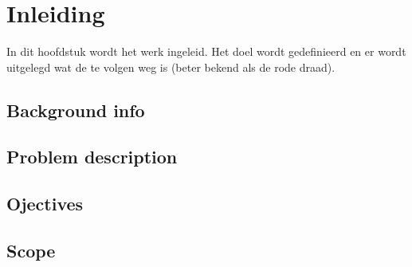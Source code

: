 \chapter{Inleiding}
\label{inleiding}
In dit hoofdstuk wordt het werk ingeleid. Het doel wordt gedefinieerd en er
wordt uitgelegd wat de te volgen weg is (beter bekend als de rode draad).

\section{Background info}
\section{Problem description}
\section{Ojectives}
\section{Scope}


